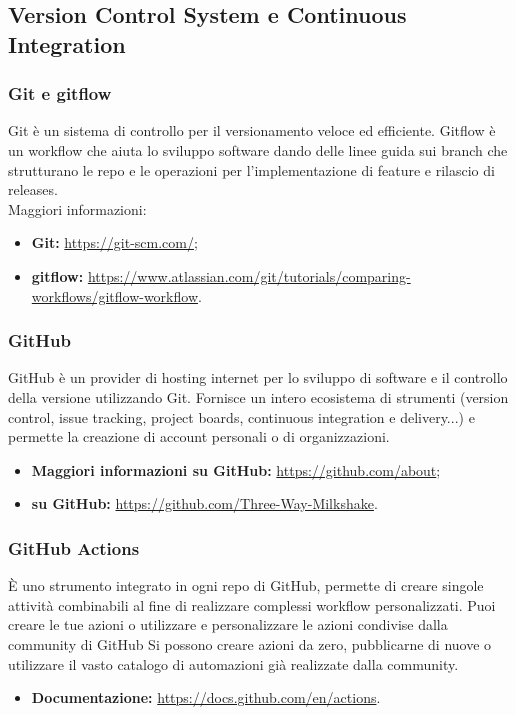 \subsection{Version Control System e Continuous Integration}

\subsubsection{Git e gitflow}
Git è un sistema di controllo per il versionamento veloce ed efficiente. Gitflow è un workflow che aiuta lo sviluppo software dando delle linee guida sui branch che strutturano le repo e le operazioni per l'implementazione di feature e rilascio di releases.\\
Maggiori informazioni:
\begin{itemize}
    \item \textbf{Git: }\url{https://git-scm.com/};
    \item \textbf{gitflow: }\url{https://www.atlassian.com/git/tutorials/comparing-workflows/gitflow-workflow}.
\end{itemize}

\subsubsection{GitHub}
GitHub è un provider di hosting internet per lo sviluppo di software e il controllo della versione utilizzando Git. Fornisce un intero ecosistema di strumenti (version control, issue tracking, project boards, continuous integration e delivery...) e permette la creazione di account personali o di organizzazioni.
\begin{itemize}
    \item \textbf{Maggiori informazioni su GitHub:} \url{https://github.com/about};
    \item \textbf{\group{} su GitHub: }\url{https://github.com/Three-Way-Milkshake}.
\end{itemize}

\subsubsection{GitHub Actions}
È uno strumento integrato in ogni repo di GitHub, permette di creare singole attività combinabili al fine di realizzare complessi workflow personalizzati. Puoi creare le tue azioni o utilizzare e personalizzare le azioni condivise dalla community di GitHub
Si possono creare azioni da zero, pubblicarne di nuove o utilizzare il vasto catalogo di automazioni già realizzate dalla community.
\begin{itemize}
    \item \textbf{Documentazione: } \url{https://docs.github.com/en/actions}.
\end{itemize}